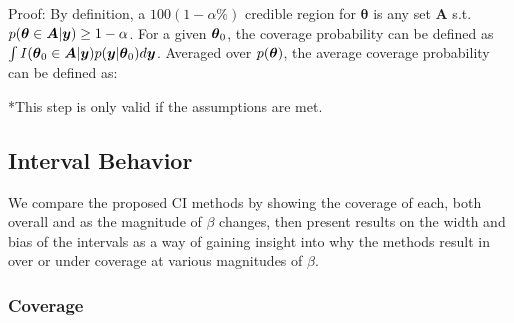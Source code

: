 Proof: By definition, a $100(1-\alpha\%)$ credible region for $\boldsymbol{\theta}$ is any set $\boldsymbol{A}$ s.t. $p(\boldsymbol{\theta} \in \boldsymbol{A} | \boldsymbol{y}) \geq 1 - \alpha$. For a given $\boldsymbol{\theta}_0$, the coverage probability can be defined as $\int I(\boldsymbol{\theta}_0 \in \boldsymbol{A} | \boldsymbol{y}) p(\boldsymbol{y} | \boldsymbol{\theta}_0)d\boldsymbol{y}$. Averaged over $p(\boldsymbol{\theta})$, the average coverage probability can be defined as:


*This step is only valid if the assumptions are met.

\subsection{Interval Behavior}

We compare the proposed CI methods by showing the coverage of each, both overall and as the magnitude of $\beta$ changes, then present results on the width and bias of the intervals as a way of gaining insight into why the methods result in over or under coverage at various magnitudes of $\beta$.

\subsubsection{Coverage}\label{Sec:Coverage}

